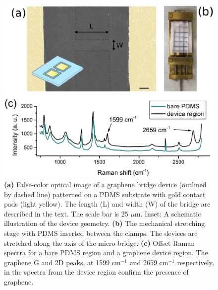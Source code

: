 \documentclass[edeposit,fullpage,draftthesis]{uiucthesis2009}
\begin{document}
        \begin{figure}
        \centering
        \vspace{0.2cm}
        \includegraphics[width=0.75\linewidth]{images/resultsanddiscussion/rippingpaper/Figure1.eps}
        \caption[Device geometry and measurement apparatus for uniaxially strained graphene]
            {\textbf{(a)} False-color optical image of a graphene bridge device
            (outlined by dashed line) patterned on a PDMS substrate with gold contact pads
            (light yellow). The length (L) and width (W) of the bridge are described in the
            text. The scale bar is 25 $\mu$m. Inset: A schematic illustration of the device
            geometry. \textbf{(b)}  The mechanical stretching stage with PDMS inserted
            between the clamps. The devices are stretched along the axis of the
            micro-bridge. \textbf{(c)} Offset Raman spectra for a bare PDMS region and a
            graphene device region. The graphene G and 2D peaks, at 1599 cm$^{-1}$ and 2659
            cm$^{-1}$ respectively, in the spectra from the device region confirm the
            presence of graphene.}
        \label{fig:rip-device}
        \end{figure}
   
\end{document}
